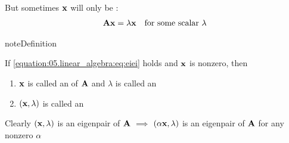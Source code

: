 \documentclass[letterpaper,10pt,english]{jupyterBook}
\begin{document}
\sphinxAtStartPar
But sometimes \({\bf x}\) will only be :
\begin{equation}\label{equation:05.linear_algebra:eq:eiei}
\begin{split}
%
{\bf A} {\bf x} = \lambda {\bf x}
\quad \text{for some scalar $\lambda$}
%
\end{split}
\end{equation}
\begin{sphinxadmonition}{note}{Definition}

\sphinxAtStartPar
If \eqref{equation:05.linear_algebra:eq:eiei} holds and \({\bf x}\) is nonzero, then
\begin{enumerate}
%
\item {} 
\sphinxAtStartPar
\({\bf x}\) is called an  of \({\bf A}\)
and \(\lambda\) is called an 

\item {} 
\sphinxAtStartPar
\(({\bf x}, \lambda)\) is called an 

\end{enumerate}
\end{sphinxadmonition}

\sphinxAtStartPar
Clearly \(({\bf x}, \lambda)\) is an eigenpair of \({\bf A}\) \(\implies\)
\((\alpha {\bf x}, \lambda)\) is an eigenpair of \({\bf A}\) for any nonzero \(\alpha\)
\end{document}
